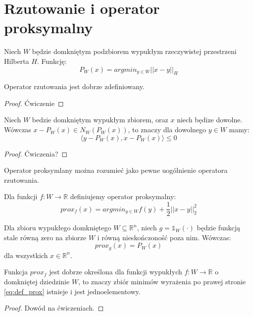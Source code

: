 \documentclass[10pt,a4paper,draft]{report}
\begin{document}
\section{Rzutowanie i operator proksymalny}

\begin{definition}
Niech $W$ będzie domkniętym podzbiorem wypukłym rzeczywistej przestrzeni Hilberta $H$. Funkcję:
\[
P_W(x) = argmin_{y \in W} ||x - y||_H
\]
\end{definition}
\begin{theorem}
Operator rzutowania jest dobrze zdefiniowany.
\end{theorem}
\begin{proof}
Ćwiczenie
\end{proof}

\begin{theorem}
Niech $W$ bedzie domkniętym wypukłym zbiorem, oraz $x$ niech będize dowolne. Wówczas $x - P_W(x) \in N_W(P_W(x))$, to znaczy dla dowolnego $y \in W$ mamy:
\[
\langle y - P_W(x), x - P_W(x) \rangle \leq 0 
\]
\end{theorem}
\begin{proof}
Ćwiczenia?
\end{proof}


Operator proksymlany można rozumieć jako pewne uogólnienie operatora rzutowania.

\begin{definition}
Dla funkcji $f : W \rightarrow \mathbb{R}$ definiujemy operator proksymalny:
\begin{equation}\label{eq:def_prox}
prox_f(x) = argmin_{y \in W} f(y) + \frac{1}{2}||x-y||_2^2 
\end{equation}
\end{definition}

\begin{theorem}
Dla zbioru wypukłego domkniętego $W \subseteq \mathbb{R}^n$, niech $g = \mathds{1}_W(\cdot)$ będzie funkcją stale równą zero na zbiorze $W$ i równą nieskończoność poza nim. Wówczas:
\[
prox_g(x) = P_W(x)
\]
dla wszystkich $x \in \mathbb{R}^n$.
\end{theorem} 

\begin{theorem}
Funkcja $prox_f$ jest dobrze określona dla funkcji wypukłych  $f : W \rightarrow \mathbb{R}$ o domkniętej dziedzinie $W$, to znaczy zbiór minimów wyrażenia po prawej stronie \ref{eq:def_prox} istnieje i jest jednoelementowy. 
\end{theorem}
\begin{proof}
Dowód na ćwiczeniach.
\end{proof}
\end{document}
